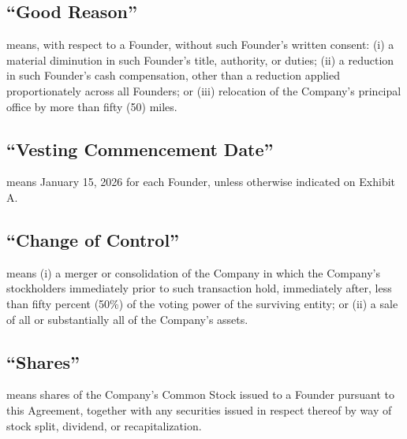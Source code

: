 \subsection{``Good Reason''} means, with respect to a Founder, without such Founder's written consent: (i) a material diminution in such Founder's title, authority, or duties; (ii) a reduction in such Founder's cash compensation, other than a reduction applied proportionately across all Founders; or (iii) relocation of the Company's principal office by more than fifty (50) miles.

\subsection{``Vesting Commencement Date''} means January 15, 2026 for each Founder, unless otherwise indicated on Exhibit A.

\subsection{``Change of Control''} means (i) a merger or consolidation of the Company in which the Company's stockholders immediately prior to such transaction hold, immediately after, less than fifty percent (50\%) of the voting power of the surviving entity; or (ii) a sale of all or substantially all of the Company's assets.

\subsection{``Shares''} means shares of the Company's Common Stock issued to a Founder pursuant to this Agreement, together with any securities issued in respect thereof by way of stock split, dividend, or recapitalization.
